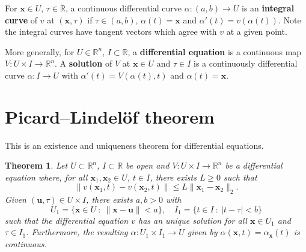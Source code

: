 \documentclass[letter-paper]{tufte-book}
\newtheorem{theorem}{\color{pastel-blue}Theorem}[section]
\begin{document}
For $\boldsymbol{x} \in U$, $\tau \in \mathbb{R}$, a continuous differential
curve $\alpha : (a,b) \to U$ is an \textbf{integral curve} of $v$ at
$(\boldsymbol{x}, \tau)$ if $\tau \in (a,b)$, $\alpha(t) = \boldsymbol{x}$ and
$\alpha'(t) = v(\alpha(t))$. Note the integral curves have tangent vectors which
agree with $v$ at a given point.

More generally, for $U \in \mathbb{R}^n$, $I \subset \mathbb{R}$, a
\textbf{differential equation} is a continuous map $V : U\times I \to
\mathbb{R}^n$. A \textbf{solution} of $V$ at $\boldsymbol{x} \in U$ and $\tau
\in I$ is a continuously differential curve $\alpha : I \to U$ with $\alpha'(t)
= V(\alpha(t), t)$ and $\alpha(t) = \boldsymbol{x}$.


\section{Picard--Lindel\"of theorem}

This is an existence and uniqueness theorem for differential equations.

\begin{theorem}
  Let $U \subset \mathbb{R}^n$, $I \subset \mathbb{R}$ be open and $V : U\times
  I \to \mathbb{R}^n$ be a differential equation where, for all
  $\boldsymbol{x}_1, \boldsymbol{x}_2 \in U$, $t \in I$, there exists $L \geq 0$
  such that
  \begin{equation*}
    \|v(\boldsymbol{x}_1, t) - v(\boldsymbol{x}_2, t)\| \leq L \|\boldsymbol{x}_1 - \boldsymbol{x}_2\|_2.
  \end{equation*}
  Given $(\boldsymbol{u}, \tau) \in U \times I$, there exists $a,b>0$ with
  \begin{equation*}
    U_1 = \{\boldsymbol{x} \in U\ :\ \|\boldsymbol{x} - \boldsymbol{u}\| < a\}, \quad
    I_1 = \{t \in I\ :\ |t - \tau| < b\}
  \end{equation*}
  such that the differential equation $v$ has an unique solution for all
  $\boldsymbol{x} \in U_1$ and $\tau \in I_1$. Furthermore, the resulting
  $\alpha : U_1 \times I_1 \to U$ given by $\alpha(\boldsymbol{x}, t) =
  \alpha_{\boldsymbol{x}}(t)$ is continuous.
\end{theorem}
\end{document}
